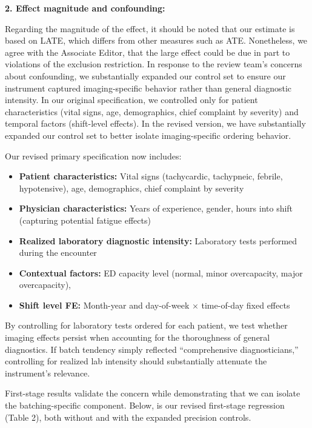 \documentclass[11pt]{article}
\newcommand{\1}{\hbox{\rm 1\kern-.35em 1}}
\begin{document}
\textbf{2. Effect magnitude and confounding:}

Regarding the magnitude of the effect, it should be noted that our estimate is based on LATE, which differs from other measures such as ATE. Nonetheless, we agree with the Associate Editor, that the large effect could be due in part to violations of the exclusion restriction. In response to the review team's concerns about confounding, we substantially expanded our control set to ensure our instrument captured imaging-specific behavior rather than general diagnostic intensity. In our original specification, we controlled only for patient characteristics (vital signs, age, demographics, chief complaint by severity) and temporal factors (shift-level effects). In the revised version, we have substantially expanded our control set to better isolate imaging-specific ordering behavior.

Our revised primary specification now includes:

\begin{itemize}
\item \textbf{Patient characteristics:} Vital signs (tachycardic, tachypneic, febrile, hypotensive), age, demographics, chief complaint by severity
\item \textbf{Physician characteristics:} Years of experience, gender, hours into shift (capturing potential fatigue effects)
\item \textbf{Realized laboratory diagnostic intensity:} Laboratory tests performed during the encounter
\item \textbf{Contextual factors:} ED capacity level (normal, minor overcapacity, major overcapacity),
\item \textbf{Shift level FE:} Month-year and day-of-week $\times$ time-of-day fixed effects
\end{itemize}

By controlling for laboratory tests ordered for each patient, we test whether imaging effects persist when accounting for the thoroughness of general diagnostics. If batch tendency simply reflected ``comprehensive diagnosticians,'' controlling for realized lab intensity should substantially attenuate the instrument's relevance.

First-stage results validate the concern while demonstrating that we can isolate the batching-specific component. Below, is our revised first-stage regression (Table 2), both without and with the expanded precision controls.
\end{document}
